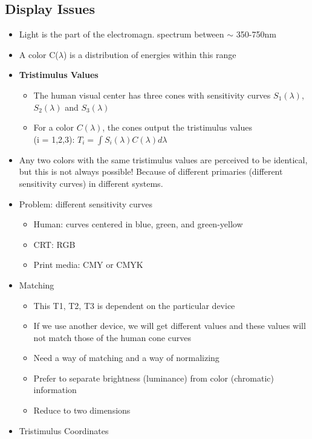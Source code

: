 \documentclass[11pt,a4paper]{article}
\begin{document}
	\subsection{Display Issues}
		\begin{itemize}
			\item Light is the part of the electromagn. spectrum between $\sim$ 350-750nm	
			\item A color C($\lambda$) is a distribution of energies within this range	
			\item \textbf{Tristimulus Values}
				\begin{itemize}
					\item The human visual center has three cones with sensitivity curves $S_1(\lambda)$, $S_2(\lambda)$ and $S_3(\lambda)$
					\item For a color $C(\lambda)$, the cones output the tristimulus values\\
					(i = 1,2,3): 
					$T_i = \int S_i(\lambda)C(\lambda)d\lambda$
				\end{itemize} 			
			\item Any two colors with the same tristimulus values are perceived to be identical, but this is not always possible! Because of different primaries (different sensitivity curves) in different systems.
			\item Problem: different sensitivity curves
				\begin{itemize}
					\item Human: curves centered in blue, green, and green-yellow
					\item CRT: RGB
					\item Print media: CMY or CMYK	
				\end{itemize}
			\item Matching
				\begin{itemize}
					\item This T1, T2, T3 is dependent on the particular device	
					\item If we use another device, we will get different values and these values will not match those of the human cone curves	
					\item Need a way of matching and a way of normalizing
					\item Prefer to separate brightness (luminance) from color (chromatic) information
					\item Reduce to two dimensions
				\end{itemize}
			\item Tristimulus Coordinates

\end{itemize}
\end{document}
